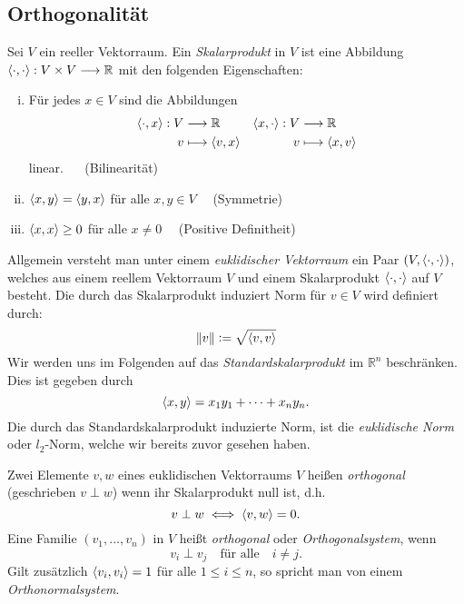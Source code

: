 \subsection{Orthogonalität}
\begin{defn}
Sei $V$ ein reeller Vektorraum. Ein \textit{Skalarprodukt} in $V$ ist eine Abbildung $\langle \cdot, \cdot \rangle: V \times V \longrightarrow \mathbb{R}$ mit den folgenden Eigenschaften:
\begin{enumerate}[(i)]
\item Für jedes $x \in V$ sind die Abbildungen
\begin{align*}
\langle \cdot, x \rangle: V & \longrightarrow \mathbb{R} & \langle x, \cdot \rangle: V & \longrightarrow \mathbb{R}\\
v & \longmapsto \langle v, x \rangle & v & \longmapsto \langle x, v \rangle
\end{align*}
linear. $\quad$ (Bilinearität)
\item $\langle x, y \rangle = \langle y, x \rangle$ für alle  $x,y \in V \quad$ (Symmetrie)
\item $\langle x, x \rangle \geq 0$ für alle $x \neq 0 \quad$ (Positive Definitheit)
\end{enumerate}
\end{defn}

Allgemein versteht man unter einem \textit{euklidischer Vektorraum} ein Paar $(V, \langle \cdot, \cdot \rangle)$, welches aus einem reellem Vektorraum $V$ und einem Skalarprodukt $\langle \cdot, \cdot \rangle$ auf $V$ besteht. Die durch das Skalarprodukt induziert Norm für $v \in V$ wird definiert durch:
$$\left\lVert v \right\rVert \vcentcolon= \sqrt{\langle v, v \rangle}$$
Wir werden uns im Folgenden auf das \textit{Standardskalarprodukt} im $\mathbb{R}^n$ beschränken. Dies ist gegeben durch 
$$\langle x, y \rangle = x_1y_1 + \cdots + x_ny_n.$$
Die durch das Standardskalarprodukt induzierte Norm, ist die \textit{euklidische Norm} oder $l_2$-Norm, welche wir bereits zuvor gesehen haben.

\begin{defn}
Zwei Elemente $v,w$ eines euklidischen Vektorraums $V$ heißen \textit{orthogonal} (geschrieben $v \perp w$) wenn ihr Skalarprodukt null ist, d.h.
$$v \perp w \iff \langle v, w \rangle = 0.$$
Eine Familie $(v_1, \ldots, v_n)$ in $V$ heißt \textit{orthogonal} oder \textit{Orthogonalsystem}, wenn
$$v_i \perp v_j \quad \text{für alle} \quad i \neq j.$$
Gilt zusätzlich $\langle v_i, v_i \rangle = 1$ für alle $1 \leq i \leq n$, so spricht man von einem \textit{Orthonormalsystem}.
\end{defn}

